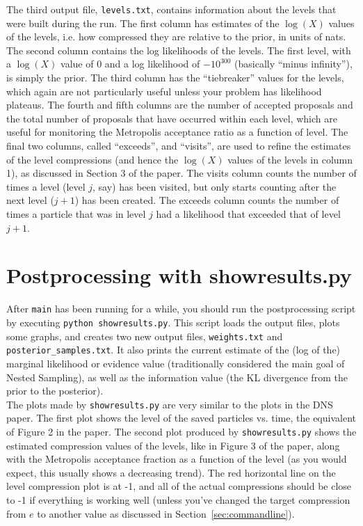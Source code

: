 \documentclass[a4paper, 11pt]{article}
\begin{document}
The third output file, {\tt levels.txt}, contains information about the levels
that were built during the run. The first column has estimates of the $\log(X)$
values of the levels, i.e. how compressed they are relative to the prior, in
units of nats. The second column contains the log likelihoods of the levels.
The first level, with a $\log(X)$ value of 0 and a log likelihood of
$-10^{300}$ (basically ``minus infinity''), is simply the prior. The third
column has the ``tiebreaker'' values for the levels, which again are not
particularly useful unless your problem has likelihood plateaus. The fourth
and fifth columns are the number of accepted proposals and the total number
of proposals that have occurred within each level, which are useful for
monitoring the Metropolis acceptance ratio as a function of level.
The final two columns, called ``exceeds'', and ``visits'', are used to refine
the estimates of the level compressions (and hence the $\log(X)$ values of
the levels in column 1), as discussed in Section 3 of the
paper. The visits column counts the number of times a level (level $j$, say)
has been visited, but only starts counting after the next level ($j+1$) has been created. The exceeds column counts the number of times a particle that was
in level $j$ had a likelihood that exceeded that of level $j+1$.
\\

\section{Postprocessing with showresults.py}
After {\tt main} has been running for
a while, you should run the postprocessing script
by executing {\tt python showresults.py}. This script loads the output files,
plots some graphs, and creates two new output files, {\tt weights.txt} and
{\tt posterior\_samples.txt}. It also prints the current estimate of the
(log of the) marginal likelihood or evidence value (traditionally considered
the main goal of Nested Sampling), as well as the information value (the KL
divergence from the prior to the posterior).\\

The plots made by {\tt showresults.py} are very similar to the plots in
the DNS paper. The first plot shows the level of the saved particles vs.
time, the equivalent of Figure 2 in the paper. The second plot produced by
{\tt showresults.py} shows the estimated compression values of the levels,
like in Figure 3 of the paper, along with the Metropolis acceptance fraction
as a function of the level (as you would expect, this usually shows a
decreasing trend). The red horizontal line on the level compression plot is
at -1, and all of the actual compressions should be close to -1 if everything
is working well (unless you've changed the target compression from $e$ to
another value as discussed in Section~\ref{sec:commandline}).
\end{document}
